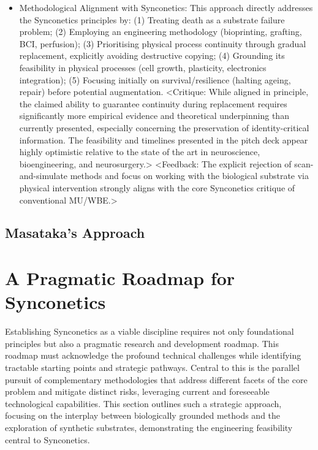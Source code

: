 \documentclass[10pt]{article}
\begin{document}
\begin{sloppypar}
\begin{itemize}
    \item Methodological Alignment with Synconetics: This approach directly addresses the Synconetics principles by: (1) Treating death as a substrate failure problem; (2) Employing an engineering methodology (bioprinting, grafting, BCI, perfusion); (3) Prioritising physical process continuity through gradual replacement, explicitly avoiding destructive copying; (4) Grounding its feasibility in physical processes (cell growth, plasticity, electronics integration); (5) Focusing initially on survival/resilience (halting ageing, repair) before potential augmentation. <Critique: While aligned in principle, the claimed ability to guarantee continuity during replacement requires significantly more empirical evidence and theoretical underpinning than currently presented, especially concerning the preservation of identity-critical information. The feasibility and timelines presented in the pitch deck appear highly optimistic relative to the state of the art in neuroscience, bioengineering, and neurosurgery.> <Feedback: The explicit rejection of scan-and-simulate methods and focus on working with the biological substrate via physical intervention strongly aligns with the core Synconetics critique of conventional MU/WBE.>
  \end{itemize}

  \subsection{Masataka's Approach}
  \label{sec:masataka-approach}


  \section{A Pragmatic Roadmap for Synconetics}
  \label{sec:roadmap}

  Establishing Synconetics as a viable discipline requires not only foundational principles but also a pragmatic research and development roadmap. This roadmap must acknowledge the profound technical challenges while identifying tractable starting points and strategic pathways. Central to this is the parallel pursuit of complementary methodologies that address different facets of the core problem and mitigate distinct risks, leveraging current and foreseeable technological capabilities. This section outlines such a strategic approach, focusing on the interplay between biologically grounded methods and the exploration of synthetic substrates, demonstrating the engineering feasibility central to Synconetics.


\end{sloppypar}
\end{document}
